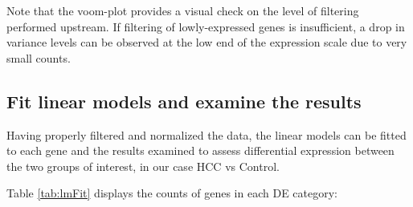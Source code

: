\documentclass[
]{book}
\newenvironment{Shaded}{\begin{snugshade}}{\end{snugshade}}
\newcommand{\CharTok}[1]{\textcolor[rgb]{0.31,0.60,0.02}{#1}}
\newcommand{\CommentTok}[1]{\textcolor[rgb]{0.56,0.35,0.01}{\textit{#1}}}
\newcommand{\DataTypeTok}[1]{\textcolor[rgb]{0.13,0.29,0.53}{#1}}
\newcommand{\FloatTok}[1]{\textcolor[rgb]{0.00,0.00,0.81}{#1}}
\newcommand{\KeywordTok}[1]{\textcolor[rgb]{0.13,0.29,0.53}{\textbf{#1}}}
\newcommand{\NormalTok}[1]{#1}
\newcommand{\OperatorTok}[1]{\textcolor[rgb]{0.81,0.36,0.00}{\textbf{#1}}}
\newcommand{\StringTok}[1]{\textcolor[rgb]{0.31,0.60,0.02}{#1}}
\begin{document}
Note that the voom-plot provides a visual check on the level of filtering performed upstream.
If filtering of lowly-expressed genes is insufficient, a drop in variance levels can be
observed at the low end of the expression scale due to very small counts.

\hypertarget{fit-linear-models-and-examine-the-results}{%
\subsection*{Fit linear models and examine the results}\label{fit-linear-models-and-examine-the-results}}

Having properly filtered and normalized the data,
the linear models can be fitted to each gene and the results
examined to assess differential expression between the two groups
of interest, in our case HCC vs Control.

Table \ref{tab:lmFit} displays the counts of genes in each DE category:

\begin{Shaded}
\end{Shaded}
\end{document}
